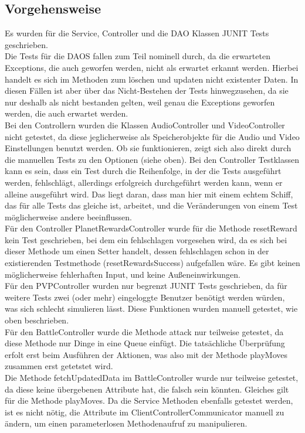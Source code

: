 \documentclass[fontsize=12pt,paper=a4,twoside]{scrartcl}
\begin{document}
\subsection{Vorgehensweise}
Es wurden für die Service, Controller und die DAO Klassen JUNIT Tests geschrieben. \\
Die Tests für die DAOS fallen zum Teil nominell durch, da die erwarteten Exceptions, die auch geworfen werden, nicht als erwartet erkannt werden. Hierbei handelt es sich im Methoden zum löschen und updaten nicht existenter Daten. In diesen Fällen ist aber über das Nicht-Bestehen der Tests hinwegzusehen, da sie nur deshalb als nicht bestanden gelten, weil genau die Exceptions geworfen werden, die auch erwartet werden. \\
Bei den Controllern wurden die Klassen AudioController und VideoController nicht getestet, da diese jeglicherweise als Speicherobjekte für die Audio und Video Einstellungen benutzt werden. Ob sie funktionieren, zeigt sich also direkt durch die manuellen Tests zu den Optionen (siehe oben). Bei den Controller Testklassen kann es sein, dass ein Test durch die Reihenfolge, in der die Tests ausgeführt werden, fehlschlägt, allerdings erfolgreich durchgeführt werden kann, wenn er alleine ausgeführt wird. Das liegt daran, dass man hier mit einem echtem Schiff, das für alle Tests das gleiche ist, arbeitet, und die Veränderungen von einem Test möglicherweise andere beeinflussen. \\
Für den Controller PlanetRewardsController wurde für die Methode resetReward kein Test geschrieben, bei dem ein fehlschlagen vorgesehen wird, da es sich bei dieser Methode um einen Setter handelt, dessen fehlschlagen schon in der existierenden Testmethode (resetRewardsSuccess) aufgefallen wäre. Es gibt keinen möglicherweise fehlerhaften Input, und keine Außeneinwirkungen. \\
Für den PVPController wurden nur begrenzt JUNIT Tests geschrieben, da für weitere Tests zwei (oder mehr) eingeloggte Benutzer benötigt werden würden, was sich schlecht simulieren lässt. Diese Funktionen wurden manuell getestet, wie oben beschrieben. \\
Für den BattleController wurde die Methode attack nur teilweise getestet, da diese Methode nur Dinge in eine Queue einfügt. Die tatsächliche Überprüfung erfolt erst beim Ausführen der Aktionen, was also mit der Methode playMoves zusammen erst getetstet wird. \\
Die Methode fetchUpdatedData im BattleController wurde nur teilweise getestet, da diese keine übergebenen Attribute hat, die falsch sein könnten. Gleiches gilt für die Methode playMoves. Da die Service Methoden ebenfalls getestet werden, ist es nicht nötig, die Attribute im ClientControllerCommunicator manuell zu ändern, um einen parameterlosen Methodenaufruf zu manipulieren. \\
\end{document}
